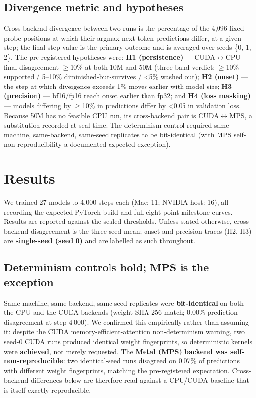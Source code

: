 \documentclass{article}
\begin{document}
\subsection{Divergence metric and hypotheses}\label{divergence-metric-and-hypotheses}

Cross-backend divergence between two runs is the percentage of the 4,096 fixed-probe
positions at which their argmax next-token predictions differ, at a given step; the
final-step value is the primary outcome and is averaged over seeds \{0, 1, 2\}. The
pre-registered hypotheses were: \textbf{H1 (persistence)} --- CUDA$\leftrightarrow$CPU final disagreement $\ge$10\% at
both 10M and 50M (three-band verdict: $\ge$10\% supported / 5--10\% diminished-but-survives / \textless5\%
washed out); \textbf{H2 (onset)} --- the step at which divergence exceeds 1\% moves earlier with
model size; \textbf{H3 (precision)} --- bf16/fp16 reach onset earlier than fp32; and \textbf{H4 (loss
masking)} --- models differing by $\ge$10\% in predictions differ by \textless0.05 in validation loss.
Because 50M has no feasible CPU run, its cross-backend pair is CUDA$\leftrightarrow$MPS, a substitution
recorded at seal time. The determinism control required same-machine, same-backend,
same-seed replicates to be bit-identical (with MPS self-non-reproducibility a documented
expected exception).


\section{Results}
We trained 27 models to 4,000 steps each (Mac: 11; NVIDIA host: 16), all recording the
expected PyTorch build and full eight-point milestone curves. Results are reported against
the sealed thresholds. Unless stated otherwise, cross-backend disagreement is the three-seed
mean; onset and precision traces (H2, H3) are \textbf{single-seed (seed 0)} and are labelled as
such throughout.

\subsection{Determinism controls hold; MPS is the exception}\label{determinism-controls-hold-mps-is-the-exception}

Same-machine, same-backend, same-seed replicates were \textbf{bit-identical} on both the CPU and
the CUDA backends (weight SHA-256 match; 0.00\% prediction disagreement at step 4,000). We
confirmed this empirically rather than assuming it: despite the CUDA memory-efficient-attention
non-determinism warning, two seed-0 CUDA runs produced identical weight fingerprints, so
deterministic kernels were \textbf{achieved}, not merely requested. The \textbf{Metal (MPS) backend was
self-non-reproducible}: two identical-seed runs disagreed on 0.07\% of predictions with
different weight fingerprints, matching the pre-registered expectation. Cross-backend
differences below are therefore read against a CPU/CUDA baseline that is itself exactly
reproducible.
\end{document}
